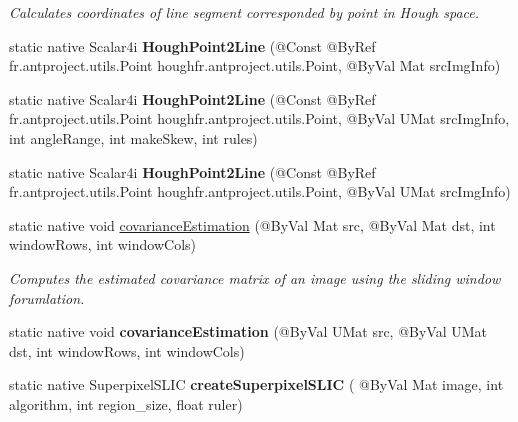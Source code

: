 \begin{DoxyCompactItemize}
\begin{DoxyCompactList}\small\item\em Calculates coordinates of line segment corresponded by point in Hough space. \end{DoxyCompactList}\item 
\mbox{\label{classorg_1_1bytedeco_1_1javacpp_1_1opencv__ximgproc_ad3b76262d53d6b53b310004575be9e84}} 
static native Scalar4i {\bfseries Hough\+Point2\+Line} (@Const @By\+Ref fr.antproject.utils.Point hough\+fr.antproject.utils.Point, @By\+Val Mat src\+Img\+Info)
\item 
\mbox{\label{classorg_1_1bytedeco_1_1javacpp_1_1opencv__ximgproc_a5bc9b23054460b330913e82837f943fa}} 
static native Scalar4i {\bfseries Hough\+Point2\+Line} (@Const @By\+Ref fr.antproject.utils.Point hough\+fr.antproject.utils.Point, @By\+Val U\+Mat src\+Img\+Info, int angle\+Range, int make\+Skew, int rules)
\item 
\mbox{\label{classorg_1_1bytedeco_1_1javacpp_1_1opencv__ximgproc_ac089080292d003ff7dea8360e4b987e5}} 
static native Scalar4i {\bfseries Hough\+Point2\+Line} (@Const @By\+Ref fr.antproject.utils.Point hough\+fr.antproject.utils.Point, @By\+Val U\+Mat src\+Img\+Info)
\item 
static native void \hyperlink{classorg_1_1bytedeco_1_1javacpp_1_1opencv__ximgproc_a821e53d932bd411235484d70e890de32}{covariance\+Estimation} (@By\+Val Mat src, @By\+Val Mat dst, int window\+Rows, int window\+Cols)
\begin{DoxyCompactList}\small\item\em Computes the estimated covariance matrix of an image using the sliding window forumlation. \end{DoxyCompactList}\item 
\mbox{\label{classorg_1_1bytedeco_1_1javacpp_1_1opencv__ximgproc_a88d11ec696a6f030dfefa7ddeeaf863b}} 
static native void {\bfseries covariance\+Estimation} (@By\+Val U\+Mat src, @By\+Val U\+Mat dst, int window\+Rows, int window\+Cols)
\item 
static native Superpixel\+S\+L\+IC {\bfseries create\+Superpixel\+S\+L\+IC} ( @By\+Val Mat image, int algorithm, int region\+\_\+size, float ruler)

\end{DoxyCompactItemize}

